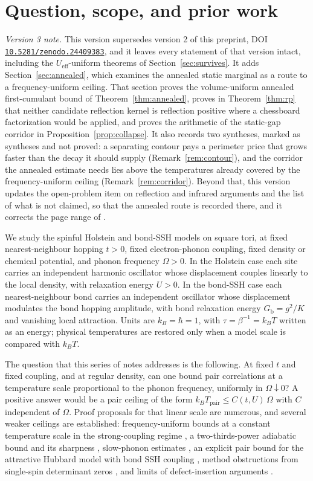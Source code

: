\documentclass[11pt]{article}
\newcommand{\DOI}[1]{\mbox{\href{https://doi.org/#1}{\nolinkurl{#1}}}}
\theoremstyle{definition}
\theoremstyle{remark}
\newcommand{\eff}{\mathrm{eff}}
\newcommand{\pair}{\mathrm{pair}}
\newcommand{\Tpair}{T_{\pair}}
\newcommand{\Gb}{G_{\mathrm{b}}}
\newcommand{\Ueff}{U_{\eff}}
\begin{document}
\section{Question, scope, and prior work}

\emph{Version 3 note.} This version supersedes version 2 of this preprint, DOI
\DOI{10.5281/zenodo.24409383}, and it leaves every statement of that version intact,
including the $\Ueff$-uniform theorems of Section~\ref{sec:survives}. It adds
Section~\ref{sec:annealed}, which examines the annealed static marginal as a route to
a frequency-uniform ceiling. That section proves the volume-uniform annealed
first-cumulant bound of Theorem~\ref{thm:annealed}, proves in Theorem~\ref{thm:rp}
that neither candidate reflection kernel is reflection positive where a chessboard
factorization would be applied, and proves the arithmetic of the static-gap corridor
in Proposition~\ref{prop:collapse}. It also records two syntheses, marked as
syntheses and not proved: a separating contour pays a perimeter price that grows
faster than the decay it should supply (Remark~\ref{rem:contour}), and the corridor
the annealed estimate needs lies above the temperatures already covered by the
frequency-uniform ceiling (Remark~\ref{rem:corridor}). Beyond that, this version
updates the open-problem item on reflection and infrared arguments and the list
of what is not claimed, so that the annealed route is
recorded there, and it corrects the page range of \cite{frohlich2005}.

We study the spinful Holstein and bond-SSH models on square tori, at fixed
nearest-neighbour hopping $t>0$, fixed electron-phonon coupling, fixed density or
chemical potential, and phonon frequency $\Omega>0$. In the Holstein case each site
carries an independent harmonic oscillator whose displacement couples linearly to
the local density, with relaxation energy $U>0$. In the bond-SSH case each
nearest-neighbour bond carries an independent oscillator whose displacement
modulates the bond hopping amplitude, with bond relaxation energy $\Gb=g^2/K$ and
vanishing local attraction. Units are $k_B=\hbar=1$, with $\tau=\beta^{-1}=k_BT$
written as an energy; physical temperatures are restored only when a model scale is
compared with $k_BT$.

The question that this series of notes addresses is the following. At fixed $t$ and
fixed coupling, and at regular density, can one bound pair correlations at a
temperature scale proportional to the phonon frequency, uniformly in
$\Omega\downarrow0$? A positive answer would be a pair ceiling of the form
$k_B\Tpair\le C(t,U)\,\Omega$ with $C$ independent of $\Omega$. Proof proposals for
that linear scale are numerous, and several weaker ceilings are established:
frequency-uniform bounds at a constant temperature scale in the strong-coupling
regime \cite{stage6}, a two-thirds-power adiabatic bound and its sharpness
\cite{linear4,linear5}, slow-phonon estimates \cite{slow}, an explicit pair bound
for the attractive Hubbard model with bond SSH coupling \cite{sshbond3}, method
obstructions from single-spin determinant zeros \cite{barriers}, and limits of
defect-insertion arguments \cite{limits}.
\end{document}
